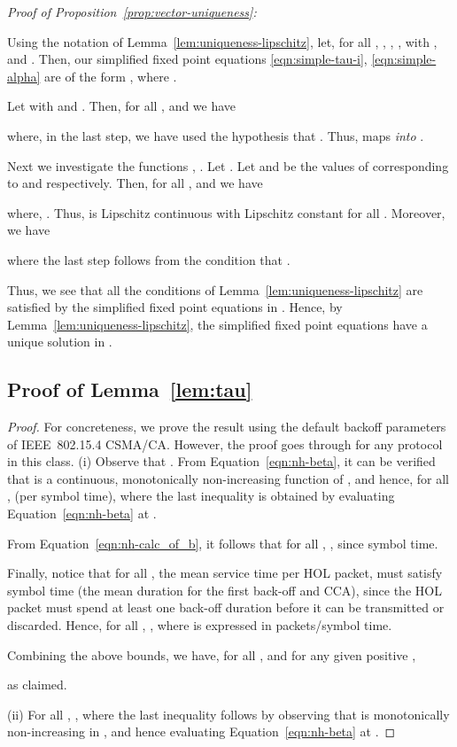\documentclass[12pt, draftclsnofoot, onecolumn]{IEEEtran}
\newcommand{\gap}{\vspace{2mm}}
\begin{document}
\gap
\noindent
\textit{Proof of Proposition~\ref{prop:vector-uniqueness}:}

Using the notation of Lemma~\ref{lem:uniqueness-lipschitz}, let, for all , , , , with , and . Then, our simplified fixed point equations \eqref{eqn:simple-tau-i}, \eqref{eqn:simple-alpha} are of the form , where . 

Let  with  and . Then,  for all , and we have

where, in the last step, we have used the hypothesis that . Thus,  maps  \emph{into} . 

Next we investigate the functions , . Let . Let  and  be the values of  corresponding to  and  respectively. Then,  for all , and we have

where, . Thus,  is Lipschitz continuous with Lipschitz constant  for all . Moreover, we have
 
where the last step follows from the condition that .

Thus, we see that all the conditions of Lemma~\ref{lem:uniqueness-lipschitz} are satisfied by the simplified fixed point equations in . Hence, by Lemma~\ref{lem:uniqueness-lipschitz}, the simplified fixed point equations have a unique solution in .\hfill \Square

\subsection{Proof of Lemma~\ref{lem:tau}}
\label{subsec:proof-lemma-tau}
\begin{proof}
For concreteness, we prove the result using the default backoff parameters of IEEE~802.15.4 CSMA/CA. However, the proof goes through for any protocol in this class.
(i) Observe that . From Equation~\eqref{eqn:nh-beta}, it can be verified that  is a continuous, monotonically non-increasing function of , and hence, for all ,  (per symbol time), where the last inequality is obtained by evaluating Equation~\eqref{eqn:nh-beta} at . 

From Equation~\eqref{eqn:nh-calc_of_b}, it follows that for all , , since  symbol time. 

Finally, notice that for all , the mean service time per HOL packet,  must satisfy  symbol time (the mean duration for the first back-off and CCA), since the HOL packet must spend at least one back-off duration before it can be transmitted or discarded. Hence, for all , , where  is expressed in packets/symbol time. 

Combining the above bounds, we have, for all , and for any given positive ,

as claimed.

\noindent
(ii) For all , , where the last inequality follows by observing that  is monotonically non-increasing in , and hence evaluating Equation~\eqref{eqn:nh-beta} at . 
\end{proof}
\end{document}
